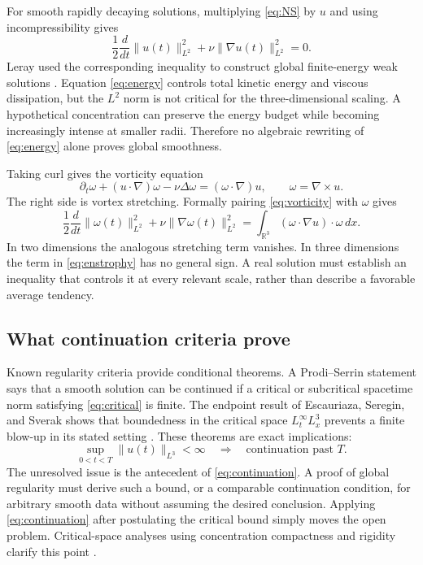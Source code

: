 \documentclass[conference]{../../../../Conference-LaTeX-template_10-17-19/IEEEtran}
\newcommand{\R}{\mathbb{R}}
\begin{document}
For smooth rapidly decaying solutions, multiplying \eqref{eq:NS} by $u$ and using incompressibility gives
\begin{equation}
\frac{1}{2}\frac{d}{dt}\|u(t)\|_{L^2}^2+
\nu\|\nabla u(t)\|_{L^2}^2=0.
\label{eq:energy}
\end{equation}
Leray used the corresponding inequality to construct global finite-energy weak solutions \cite{leray}. Equation \eqref{eq:energy} controls total kinetic energy and viscous dissipation, but the $L^2$ norm is not critical for the three-dimensional scaling. A hypothetical concentration can preserve the energy budget while becoming increasingly intense at smaller radii. Therefore no algebraic rewriting of \eqref{eq:energy} alone proves global smoothness.

Taking curl gives the vorticity equation
\begin{equation}
\partial_t\omega+(u\cdot\nabla)\omega-\nu\Delta\omega
 =(\omega\cdot\nabla)u,\qquad \omega=\nabla\times u.
\label{eq:vorticity}
\end{equation}
The right side is vortex stretching. Formally pairing \eqref{eq:vorticity} with $\omega$ gives
\begin{equation}
\frac{1}{2}\frac{d}{dt}\|\omega(t)\|_{L^2}^2+
\nu\|\nabla\omega(t)\|_{L^2}^2
=\int_{\R^3}(\omega\cdot\nabla u)\cdot\omega\,dx.
\label{eq:enstrophy}
\end{equation}
In two dimensions the analogous stretching term vanishes. In three dimensions the term in \eqref{eq:enstrophy} has no general sign. A real solution must establish an inequality that controls it at every relevant scale, rather than describe a favorable average tendency.

\subsection{What continuation criteria prove}
Known regularity criteria provide conditional theorems. A Prodi--Serrin statement says that a smooth solution can be continued if a critical or subcritical spacetime norm satisfying \eqref{eq:critical} is finite. The endpoint result of Escauriaza, Seregin, and Sverak shows that boundedness in the critical space $L_t^\infty L_x^3$ prevents a finite blow-up in its stated setting \cite{ess}. These theorems are exact implications:
\begin{equation}
\sup_{0<t<T}\|u(t)\|_{L^3}<\infty
\quad\Longrightarrow\quad
\text{continuation past }T.
\label{eq:continuation}
\end{equation}
The unresolved issue is the antecedent of \eqref{eq:continuation}. A proof of global regularity must derive such a bound, or a comparable continuation condition, for arbitrary smooth data without assuming the desired conclusion. Applying \eqref{eq:continuation} after postulating the critical bound simply moves the open problem. Critical-space analyses using concentration compactness and rigidity clarify this point \cite{kenigkoch,tao}.
\end{document}
